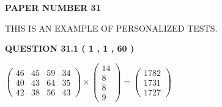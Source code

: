 \documentclass[12pt]{article}
\begin{document}
   
   
   
 {\textbf{ \Large{ PAPER NUMBER           31  }}}
   
   
\vspace{0.2in}
   
   
   
   
   
   
 \vspace{0.2in}
{\Huge  THIS IS AN EXAMPLE OF}
{\Huge  PERSONALIZED TESTS. }
   
   
  
\vspace{0.2in}
  
{\textbf{\Large{QUESTION
31.1 
 (           1 ,           1 ,          60 )
}}}
  
  
 
 
\noindent{}

 
$\left( \begin{array}{ccccccccccccccc}
          46  & 
          45  & 
          59  & 
          34  \\ 
          40  & 
          43  & 
          64  & 
          35  \\ 
          42  & 
          38  & 
          56  & 
          43
\end{array}\right) \times
\left( \begin{array}{c}
          14  \\ 
           8  \\ 
           8  \\ 
           9
\end{array}\right)  =
\left( \begin{array}{c}
        1782  \\ 
        1731  \\ 
        1727
\end{array}\right)  $
 
\end{document}
